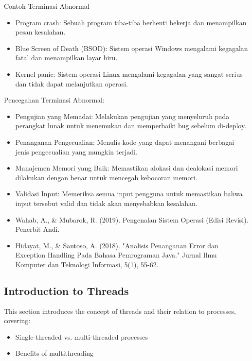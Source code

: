 \documentclass[12pt]{article}
\begin{document}
\begin{itemize}
    
    Contoh Terminasi Abnormal
    \begin{itemize}
        \item Program crash: Sebuah program tiba-tiba berhenti bekerja dan menampilkan pesan kesalahan.
        \item Blue Screen of Death (BSOD): Sistem operasi Windows mengalami kegagalan fatal dan menampilkan layar biru.
        \item Kernel panic: Sistem operasi Linux mengalami kegagalan yang sangat serius dan tidak dapat melanjutkan operasi.
    \end{itemize}
    
    
    
    Pencegahan Terminasi Abnormal:
    \begin{itemize}
        \item Pengujian yang Memadai: Melakukan pengujian yang menyeluruh pada perangkat lunak untuk menemukan dan memperbaiki bug sebelum di-deploy.
        \item Penanganan Pengecualian: Menulis kode yang dapat menangani berbagai jenis pengecualian yang mungkin terjadi.
        \item Manajemen Memori yang Baik: Memastikan alokasi dan dealokasi memori dilakukan dengan benar untuk mencegah kebocoran memori.
        \item Validasi Input: Memeriksa semua input pengguna untuk memastikan bahwa input tersebut valid dan tidak akan menyebabkan kesalahan.
    \end{itemize}
    
    \begin{itemize}
    \item {Wahab, A., & Mubarok, R. (2019). Pengenalan Sistem Operasi (Edisi Revisi). Penerbit Andi.}
    \item {Hidayat, M., & Santoso, A. (2018). "Analisis Penanganan Error dan Exception Handling Pada Bahasa Pemrograman Java." Jurnal Ilmu Komputer dan Teknologi Informasi, 5(1), 55-62.}
    \end{itemize}

\end{itemize}

\subsection{Introduction to Threads}
This section introduces the concept of threads and their relation to processes, covering:
\begin{itemize}
    \item Single-threaded vs. multi-threaded processes
    \item Benefits of multithreading
\end{itemize}
\end{document}

